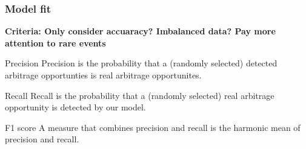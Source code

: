 \documentclass[xcolor={x11names,svgnames,dvipsnames}]{beamer}
\begin{document}
\begin{frame}
\frametitle{Model fit}
\small \textbf{Criteria: Only consider accuaracy? Imbalanced data? Pay more attention to rare events}\\
\begin{block}{Precision}
\scriptsize{Precision is the probability that a (randomly selected) detected arbitrage opportunties is real arbitrage opportunites.}\\
\end{block}
\begin{block}{Recall}
\scriptsize{Recall is the probability that a (randomly selected) real arbitrage opportunity is detected by our model.}\\
\end{block}
\begin{block}{F1 score}
\scriptsize{A measure that combines precision and recall is the harmonic mean of precision and recall.}\\
\end{block}

\end{frame}
\end{document}
